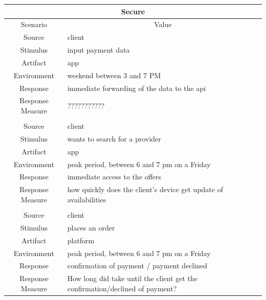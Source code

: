 \begin{table}[H]
    \begin{tabularx}{\textwidth}{|c|X|}
        \hline
        \multicolumn{2}{c}{\textbf{Secure}} \\
        \hline
        \toprule
        \multicolumn{1}{c}{Scenario} & \multicolumn{1}{c}{Value} \\
        \midrule
        Source & \gls{client}  \\
        Stimulus & input payment data \\
        Artifact & app \\
        Environment & weekend between 3 and 7 PM \\
        Response & immediate forwarding of the data to the \gls{api} \\
        Response Measure &  ??????????? \\
         & \\
        Source & \gls{client}  \\
        Stimulus & wants to search for a \gls{provider} \\
        Artifact & app \\
        Environment & peak period, between 6 and 7 pm on a Friday \\
        Response & immediate access to the offers \\
        Response Measure & how quickly does the client's device get update of availabilities \\
        & \\
        Source & \gls{client}  \\
        Stimulus & places an order \\
        Artifact & platform \\
        Environment & peak period, between 6 and 7 pm on a Friday \\
        Response & confirmation of payment / payment declined \\
        Response Measure & How long did take until the client get the confirmation/declined of payment?\\
        \bottomrule
    \end{tabularx}
\end{table}
